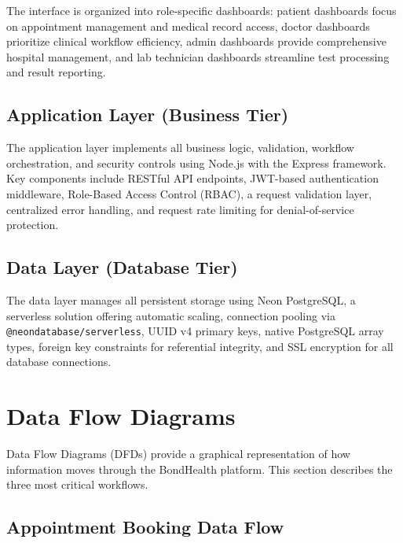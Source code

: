 \justifying
The interface is organized into role-specific dashboards: patient dashboards focus on
appointment management and medical record access, doctor dashboards prioritize clinical
workflow efficiency, admin dashboards provide comprehensive hospital management, and lab
technician dashboards streamline test processing and result reporting.

\subsection{Application Layer (Business Tier)}

\justifying
The application layer implements all business logic, validation, workflow orchestration, and
security controls using Node.js with the Express framework. Key components include RESTful
API endpoints, JWT-based authentication middleware, Role-Based Access Control (RBAC),
a request validation layer, centralized error handling, and request rate limiting for
denial-of-service protection.

\subsection{Data Layer (Database Tier)}

\justifying
The data layer manages all persistent storage using Neon PostgreSQL, a serverless solution
offering automatic scaling, connection pooling via \texttt{@neondatabase/serverless}, UUID v4
primary keys, native PostgreSQL array types, foreign key constraints for referential
integrity, and SSL encryption for all database connections.


\section{Data Flow Diagrams}

\justifying
Data Flow Diagrams (DFDs) provide a graphical representation of how information moves
through the BondHealth platform. This section describes the three most critical workflows.

\subsection{Appointment Booking Data Flow}


